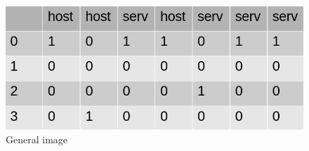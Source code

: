 \documentclass[10pt,a4paper,oneside]{article}
\begin{document}
\vspace{0.8cm}

\begin{figure}[!h]
\centering
\includegraphics[scale=0.5]{./images/image.png}
\caption{General image}
\label{image}
\end{figure}

\vspace{0.8cm}
\end{document}
